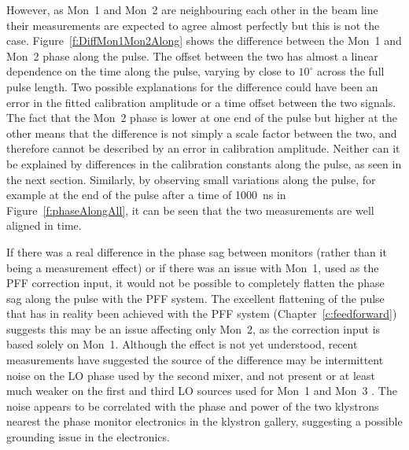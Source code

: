 However, as Mon~1 and Mon~2 are neighbouring each other in the beam line their measurements are expected to agree almost perfectly but this is not the case. Figure~\ref{f:DiffMon1Mon2Along} shows the difference between the Mon~1 and Mon~2 phase along the pulse. The offset between the two has almost a linear dependence on the time along the pulse, varying by close to \(10^\circ\) across the full pulse length. Two possible explanations for the difference could have been an error in the fitted calibration amplitude or a time offset between the two signals. The fact that the Mon~2 phase is lower at one end of the pulse but higher at the other means that the difference is not simply a scale factor between the two, and therefore cannot be described by an error in calibration amplitude. Neither can it be explained by differences in the calibration constants along the pulse, as seen in the next section. Similarly, by observing small variations along the pulse, for example at the end of the pulse after a time of 1000~ns in Figure~\ref{f:phaseAlongAll}, it can be seen that the two measurements are well aligned in time.

If there was a real difference in the phase sag between monitors (rather than it being a measurement effect) or if there was an issue with Mon~1, used as the PFF correction input, it would not be possible to completely flatten the phase sag along the pulse with the PFF system. The excellent flattening of the pulse that has in reality been achieved with the PFF system (Chapter~\ref{c:feedforward}) suggests this may be an issue affecting only Mon~2, as the correction input is based solely on Mon~1. Although the effect is not yet understood, recent measurements have suggested the source of the difference may be intermittent noise on the LO phase used by the second mixer, and not present or at least much weaker on the first and third LO sources used for Mon~1 and Mon~3 \cite{jackFONTAug16}. The noise appears to be correlated with the phase and power of the two klystrons nearest the phase monitor electronics in the klystron gallery, suggesting a possible grounding issue in the electronics.


